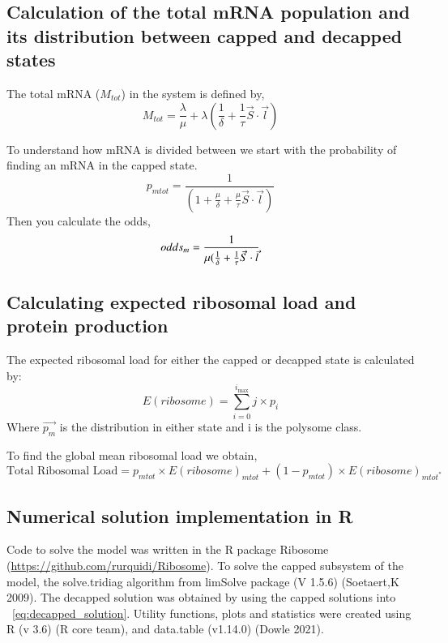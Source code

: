 \documentclass[review]{elsarticle}
\newcommand{\imax}{\ensuremath{{i_{\max}}}\xspace}
\begin{document}
\subsection{Calculation of the total mRNA population and its distribution between capped and decapped states}
The total mRNA ($M_{tot}$) in the system is defined by,
\begin{equation}
	M_{tot} = \frac{\lambda}{\mu} +  \lambda(\frac{1}{\delta} + \frac{1}{\tau}\vec{S} \cdot \vec{l})
\end{equation}

To understand how mRNA is divided  between we start with the probability of finding an mRNA in the capped state.
\begin{equation*}
	p_{mtot} = \frac{1}{(1  + \frac{\mu}{\delta} + \frac{\mu}{\tau}\vec{S} \cdot \vec{l})}	
\end{equation*}
Then you calculate the odds,
\begin{equation}\label{eq:odds}
	odds_{m} = \frac{1}{\mu(\frac{1}{\delta} + \frac{1}{\tau}\vec{S} \cdot \vec{l}} \\
\end{equation}


\subsection{Calculating expected ribosomal load and protein production}
The expected ribosomal load for either the capped or decapped state is calculated by:
\begin{equation}\label{eq:Expected_ribo_load}
	E(ribosome) =\sum_{i=0}^{\imax}j\times p_{i}
\end{equation}
Where $\vec{p_m}$ is the distribution in either state and i is the polysome class.

To find the global mean ribosomal load we obtain,
\begin{equation}\label{eq:System_ribo_load}
	\text{Total Ribosomal Load} = p_{mtot}\times E(ribosome)_{mtot} + (1-p_{mtot})\times E(ribosome)_{mtot^*}
\end{equation}

\subsection{Numerical solution implementation in R}
Code to solve the model was written in the R package Ribosome (\url{https://github.com/rurquidi/Ribosome}). To solve the capped subsystem of the model, the solve.tridiag algorithm from limSolve package (V 1.5.6) (Soetaert,K 2009). The decapped solution was obtained by using the capped solutions into ~\ref{eq:decapped_solution}. Utility functions, plots and statistics were created using  R (v 3.6) (R core team), and  data.table (v1.14.0) (Dowle 2021). 
		
\end{document}
